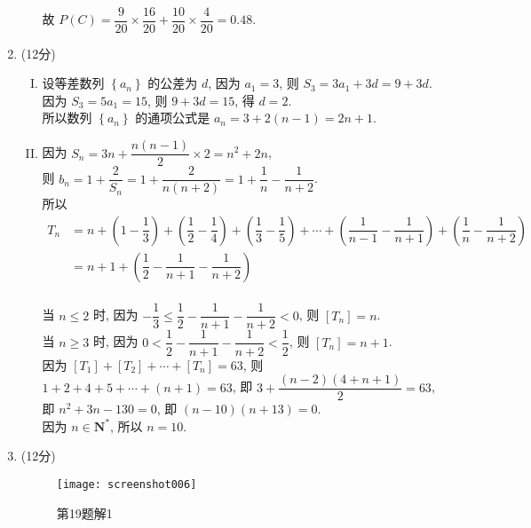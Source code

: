 \documentclass[11pt]{article}
\begin{document}
\begin{enumerate}
\begin{enumerate}[(I)]
		\\故 $P(C)=\dfrac{9}{20} \times \dfrac{16}{20}+\dfrac{10}{20} \times \dfrac{4}{20}=0.48$.
	\end{enumerate}
	\item (12分)
	\begin{enumerate}[(I)]
		\item  设等差数列 $\left\{a_{n}\right\}$ 的公差为 $d$, 因为 $a_{1}=3$, 则 $S_{3}=3 a_{1}+3 d=9+3 d$.
		\\因为 $S_{3}=5 a_{1}=15$, 则 $9+3 d=15$, 得 $d=2$.
		\\所以数列 $\left\{a_{n}\right\}$ 的通项公式是 $a_{n}=3+2(n-1)=2 n+1$.
		\item 因为 $S_{n}=3 n+\dfrac{n(n-1)}{2} \times 2=n^{2}+2 n$, 
		\\则 $b_{n}=1+\dfrac{2}{S_{n}}=1+\dfrac{2}{n(n+2)}=1+\dfrac{1}{n}-\dfrac{1}{n+2}$.
		\\所以
		\begin{align*}
			T_{n} &=n+\left(1-\dfrac{1}{3}\right)+\left(\dfrac{1}{2}-\dfrac{1}{4}\right)+\left(\dfrac{1}{3}-\dfrac{1}{5}\right)+\cdots+\left(\dfrac{1}{n-1}-\dfrac{1}{n+1}\right)+\left(\dfrac{1}{n}-\dfrac{1}{n+2}\right) \\
			&=n+1+\left(\dfrac{1}{2}-\dfrac{1}{n+1}-\dfrac{1}{n+2}\right)
		\end{align*}
		\\
		当 $n \leqslant 2$ 时, 因为 $-\dfrac{1}{3} \leqslant \dfrac{1}{2}-\dfrac{1}{n+1}-\dfrac{1}{n+2}<0$, 则 $\left[T_{n}\right]=n$.
		\\当 $n \geqslant 3$ 时, 因为 $0<\dfrac{1}{2}-\dfrac{1}{n+1}-\dfrac{1}{n+2}<\dfrac{1}{2}$, 则 $\left[T_{n}\right]=n+1$.
		\\因为 $\left[T_{1}\right]+\left[T_{2}\right]+\cdots+\left[T_{n}\right]=63$, 则 $1+2+4+5+\cdots+(n+1)=63$, 即 $3+\dfrac{(n-2)(4+n+1)}{2}=63$,
		\\即 $n^{2}+3 n-130=0$, 即 $(n-10)(n+13)=0 .$ \\因为 $n \in \mathbf{N}^{*}$, 所以 $n=10$.
	\end{enumerate}
	\item (12分)
	\begin{figure}[htbp]
		\centering
		\begin{minipage}{220pt}
			\centering
			\texttt{[image: screenshot006]}
			\caption{\heiti 第19题解1}
			\label{fig:screenshot006}
		\end{minipage}

\end{figure}
\end{enumerate}
\end{document}
